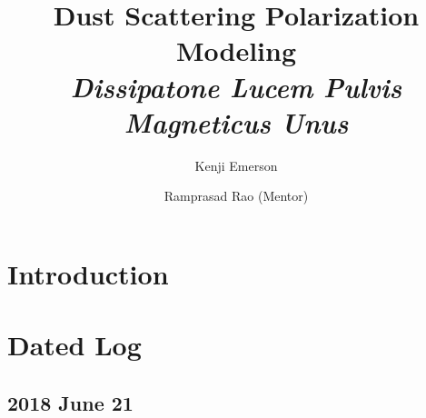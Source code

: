 \documentclass[twocolumn]{article}
\begin{document}
\title{Dust Scattering Polarization Modeling \\
\textit{\Large Dissipatone Lucem Pulvis Magneticus Unus}}

\author[1]{Kenji Emerson}
\author[2]{Ramprasad Rao (Mentor)}



\section{Introduction}
\label{sec:Introduction}


\section{Dated Log}
\label{sec:Dated_Log}

\subsection{2018 June 21}
\label{subsec:2018_June_6}
\end{document}
